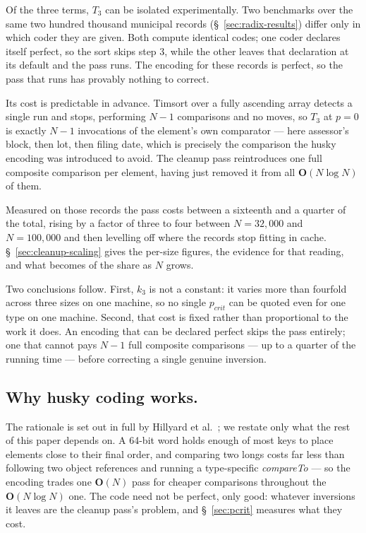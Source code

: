 \documentclass[twoside,leqno,twocolumn]{article}
\begin{document}
Of the three terms, $T_3$ can be isolated experimentally.
Two benchmarks over the same two hundred thousand municipal records (\S~\ref{sec:radix-results})
differ only in which coder they are given.
Both compute identical codes; one coder declares itself perfect, so the sort skips step 3,
while the other leaves that declaration at its default and the pass runs.
The encoding for these records is perfect, so the pass that runs has provably nothing to correct.

Its cost is predictable in advance.
Timsort over a fully ascending array detects a single run and stops,
performing $N-1$ comparisons and no moves,
so $T_3$ at $p = 0$ is exactly $N-1$ invocations of the element's own comparator ---
here assessor's block, then lot, then filing date,
which is precisely the comparison the husky encoding was introduced to avoid.
The cleanup pass reintroduces one full composite comparison per element,
having just removed it from all $\textbf{O}(N \log N)$ of them.

Measured on those records the pass costs between a sixteenth and a quarter of the total, rising by a
factor of three to four between $N = 32{,}000$ and $N = 100{,}000$ and then levelling off where the
records stop fitting in cache.
\S~\ref{sec:cleanup-scaling} gives the per-size figures, the evidence for that reading, and what
becomes of the share as $N$ grows.

Two conclusions follow.
First, $k_3$ is not a constant: it varies more than fourfold across three sizes on one machine,
so no single $p_{crit}$ can be quoted even for one type on one machine.
Second, that cost is fixed rather than proportional to the work it does.
An encoding that can be declared perfect skips the pass entirely; one that cannot pays $N-1$ full
composite comparisons --- up to a quarter of the running time --- before correcting a single genuine
inversion.

\subsection{Why husky coding works.}
\label{sec:why-husky}

The rationale is set out in full by Hillyard et al.~\cite{huskysort2020}; we restate only what the rest of
this paper depends on.
A 64-bit word holds enough of most keys to place elements close to their final order, and comparing two
longs costs far less than following two object references and running a type-specific
\textit{compareTo} --- so the encoding trades one $\textbf{O}(N)$ pass for cheaper comparisons throughout
the $\textbf{O}(N \log N)$ one.
The code need not be perfect, only good: whatever inversions it leaves are the cleanup pass's problem, and
\S~\ref{sec:pcrit} measures what they cost.
\end{document}
